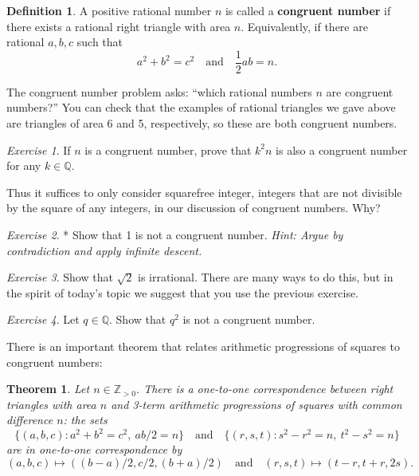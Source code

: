\documentclass{article}
\newtheorem{theorem}{Theorem}%
\theoremstyle{definition}
\newtheorem{definition}{Definition}%
\theoremstyle{remark}
\newtheorem{exercise}{Exercise}
\newcommand{\QQ}{\mathbb{Q}}
\newcommand{\ZZ}{\mathbb{Z}}
\begin{document}
\begin{definition}
    A positive rational number \(n\) is called a \textbf{congruent number} if there exists a rational right triangle with area \(n\).
    Equivalently, if there are rational \(a,b,c\) such that 
   \[a^2+b^2=c^2\quad\text{and}\quad \frac{1}{2}ab=n.\]
\end{definition}

The congruent number problem asks: ``which rational numbers \(n\) are congruent numbers?''
You can check that the examples of rational triangles we gave above are triangles of area 6 and 5, respectively, so these are both congruent numbers.

\begin{exercise}
    If \(n\) is a congruent number, prove that \(k^2n\) is also a congruent number for any \(k\in\QQ\).
\end{exercise}

Thus it suffices to only consider squarefree integer, integers that are not divisible by the square of any integers, in our discussion of congruent numbers. Why?

\begin{exercise}*
    Show that 1 is not a congruent number.
    {\it Hint: Argue by contradiction and apply infinite descent.}
\end{exercise}

\begin{exercise}
    Show that \(\sqrt{2}\) is irrational.
	There are many ways to do this, but in the spirit of today's topic we suggest that you use the previous exercise.
\end{exercise}

\begin{exercise}
    Let \(q\in\QQ\).
    Show that \(q^2\) is not a congruent number.
\end{exercise}

There is an important theorem that relates arithmetic progressions of squares to congruent numbers:

\begin{theorem}
	Let \(n\in\ZZ_{>0}\).
	There is a one-to-one correspondence between right triangles with area \(n\) and 3-term arithmetic progressions of squares with common difference \(n\): the sets
	\[\{(a,b,c):a^2+b^2=c^2,\ ab/2=n\}\quad\text{and}\quad\{(r,s,t):s^2-r^2=n,\ t^2-s^2=n\}\]
	are in one-to-one correspondence by
	\[(a,b,c)\longmapsto((b-a)/2,c/2,(b+a)/2)\quad\text{and}\quad(r,s,t)\longmapsto(t-r,t+r,2s).\]
\end{theorem}
\end{document}
